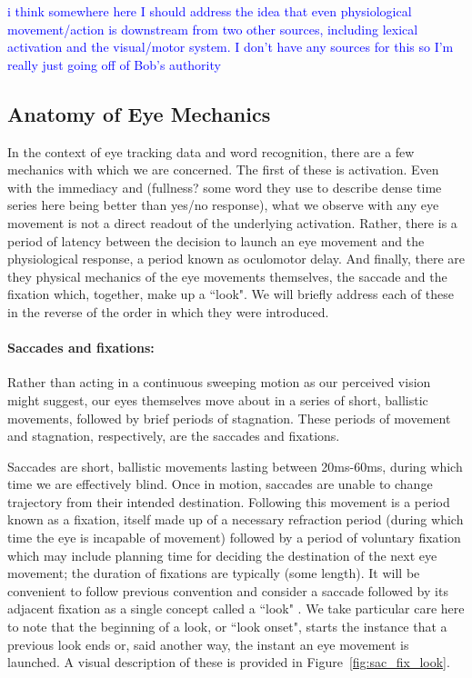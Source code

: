 \documentclass{article}
\providecommand{\cn}[1]{\textcolor{blue}{#1}}
\begin{document}
\cn{i think somewhere here I should address the idea that even physiological movement/action is downstream from two other sources, including lexical activation and the visual/motor system. I don't have any sources for this so I'm really just going off of Bob's authority}

\subsection{Anatomy of Eye Mechanics}

In the context of eye tracking data and word recognition, there are a few mechanics with which we are concerned. The first of these is activation. Even with the immediacy and (fullness? some word they use to describe dense time series here being better than yes/no response), what we observe with any eye movement is not a direct readout of the underlying activation.  Rather, there is a period of latency between the decision to launch an eye movement and the physiological response, a period known as oculomotor delay. And finally, there are they physical mechanics of the eye movements themselves, the saccade and the fixation which, together, make up a ``look". We will briefly address each of these in the reverse of the order in which they were introduced.


\paragraph{Saccades and fixations:} Rather than acting in a continuous sweeping motion as our perceived vision might suggest, our eyes themselves move about in a series of short, ballistic movements, followed by brief periods of stagnation. These periods of movement and stagnation, respectively, are the saccades and fixations. 

Saccades are short, ballistic movements lasting between 20ms-60ms, during which time we are effectively blind. Once in motion, saccades are unable to change trajectory from their intended destination. Following this movement is a period known as a fixation, itself made up of a necessary refraction period (during which time the eye is incapable of movement) followed by a period of voluntary fixation which may include planning time for deciding the destination of the next eye movement; the duration of fixations are typically (some length). It will be convenient to follow previous convention and consider a saccade followed by its adjacent fixation as a single concept called a ``look" \cite{mcmurray2002look}. We take particular care here to note that the beginning of a look, or ``look onset", starts the instance that a previous look ends or, said another way, the instant an eye movement is launched. A visual description of these is provided in Figure~\ref{fig:sac_fix_look}.
\end{document}
